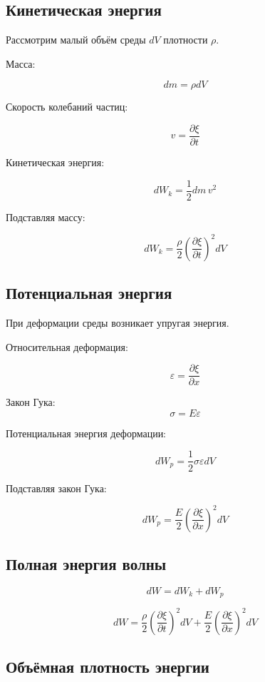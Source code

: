 \documentclass[a4paper,12pt]{article}
\begin{document}
\subsection*{Кинетическая энергия}

Рассмотрим малый объём среды \(dV\) плотности \(\rho\).

Масса:

\[
dm = \rho dV
\]

Скорость колебаний частиц:

\[
v = \frac{\partial \xi}{\partial t}
\]

Кинетическая энергия:

\[
dW_k = \frac{1}{2} dm \, v^2
\]

Подставляя массу:

\[
dW_k =
\frac{\rho}{2}
\left(
\frac{\partial \xi}{\partial t}
\right)^2 dV
\]

\subsection*{Потенциальная энергия}

При деформации среды возникает упругая энергия.

Относительная деформация:

\[
\varepsilon = \frac{\partial \xi}{\partial x}
\]

\begin{theorembox}
Закон Гука:
\[
\sigma = E \varepsilon
\]
\end{theorembox}

Потенциальная энергия деформации:

\[
dW_p =
\frac{1}{2} \sigma \varepsilon dV
\]

Подставляя закон Гука:

\[
dW_p =
\frac{E}{2}
\left(
\frac{\partial \xi}{\partial x}
\right)^2 dV
\]

\subsection*{Полная энергия волны}

\[
dW = dW_k + dW_p
\]

\[
dW =
\frac{\rho}{2}
\left(
\frac{\partial \xi}{\partial t}
\right)^2 dV
+
\frac{E}{2}
\left(
\frac{\partial \xi}{\partial x}
\right)^2 dV
\]

\subsection*{Объёмная плотность энергии}
\end{document}
